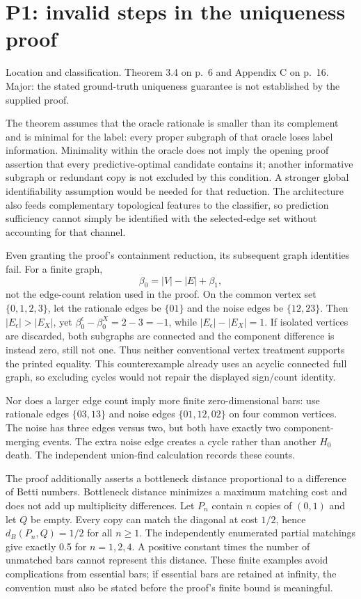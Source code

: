 \documentclass[10pt]{article}
\begin{document}
\section*{P1: invalid steps in the uniqueness proof}
Location and classification. Theorem 3.4 on p. 6 and Appendix C on p. 16. Major: the stated ground-truth uniqueness guarantee is not established by the supplied proof.\par
The theorem assumes that the oracle rationale is smaller than its complement and is minimal for the label: every proper subgraph of that oracle loses label information. Minimality within the oracle does not imply the opening proof assertion that every predictive-optimal candidate contains it; another informative subgraph or redundant copy is not excluded by this condition. A stronger global identifiability assumption would be needed for that reduction. The architecture also feeds complementary topological features to the classifier, so prediction sufficiency cannot simply be identified with the selected-edge set without accounting for that channel.\par
Even granting the proof’s containment reduction, its subsequent graph identities fail. For a finite graph, \[\beta_0=|V|-|E|+\beta_1,\] not the edge-count relation used in the proof. On the common vertex set \(\{0,1,2,3\}\), let the rationale edges be \(\{01\}\) and the noise edges be \(\{12,23\}\). Then \(|E_\epsilon|>|E_X|\), yet \(\beta_0^\epsilon-\beta_0^X=2-3=-1\), while \(|E_\epsilon|-|E_X|=1\). If isolated vertices are discarded, both subgraphs are connected and the component difference is instead zero, still not one. Thus neither conventional vertex treatment supports the printed equality. This counterexample already uses an acyclic connected full graph, so excluding cycles would not repair the displayed sign/count identity.\par
Nor does a larger edge count imply more finite zero-dimensional bars: use rationale edges \(\{03,13\}\) and noise edges \(\{01,12,02\}\) on four common vertices. The noise has three edges versus two, but both have exactly two component-merging events. The extra noise edge creates a cycle rather than another \(H_0\) death. The independent union-find calculation records these counts.\par
The proof additionally asserts a bottleneck distance proportional to a difference of Betti numbers. Bottleneck distance minimizes a maximum matching cost and does not add up multiplicity differences. Let \(P_n\) contain \(n\) copies of \((0,1)\) and let \(Q\) be empty. Every copy can match the diagonal at cost \(1/2\), hence \(d_B(P_n,Q)=1/2\) for all \(n\geq1\). The independently enumerated partial matchings give exactly 0.5 for \(n=1,2,4\). A positive constant times the number of unmatched bars cannot represent this distance. These finite examples avoid complications from essential bars; if essential bars are retained at infinity, the convention must also be stated before the proof’s finite bound is meaningful.\par
\end{document}
